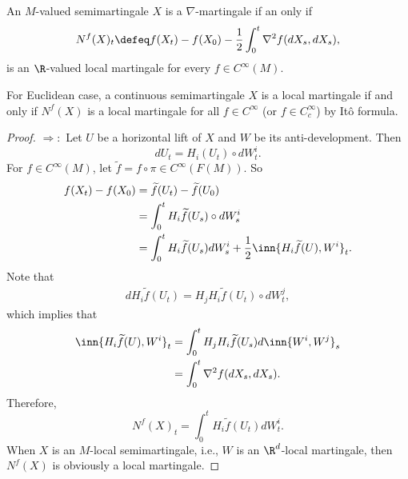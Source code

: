\begin{prop}
    An $M$-valued semimartingale $X$ is a $\nabla$-martingale if an only if 
    \begin{equation*}
        N^f(X)_t \defeq f(X_t) - f(X_0) - \frac{1}{2}\int_0^t \nabla^2f(dX_s,dX_s),
    \end{equation*}
    is an $\R$-valued local martingale for every $f \in C^\infty(M)$.
\end{prop}
\begin{rmk}
    For Euclidean case, a continuous semimartingale $X$ is a local martingale if and only if $N^f(X)$ is a local martingale for all $f \in C^\infty$ (or $f \in C_c^\infty$) by It\^o formula.
\end{rmk}
\begin{proof}
    $\Rightarrow:$ Let $U$ be a horizontal lift of $X$ and $W$ be its anti-development. Then
    \begin{equation*}
        dU_t = H_i(U_t) \circ dW^i_t.
    \end{equation*}
    For $f \in C^\infty(M)$, let $\widetilde{f} = f \circ \pi \in C^\infty(F(M))$. So
    \begin{align*}
        f(X_t) - f(X_0) &= \widetilde{f}(U_t) - \widetilde{f}(U_0) \\
        &= \int_0^t H_i\widetilde{f}(U_s) \circ dW^i_s \\
        &= \int_0^tH_i\widetilde{f}(U_s) dW^i_s + \frac{1}{2}\inn{H_i \widetilde{f}(U),W^i}_t.
    \end{align*}
    Note that
    \begin{align*}
        d H_i \widetilde{f}(U_t) = H_jH_i\widetilde{f}(U_t) \circ dW^j_t,
    \end{align*}
    which implies that
    \begin{align*}
        \inn{H_i \widetilde{f}(U),W^i}_t &= \int_0^tH_jH_i\widetilde{f}(U_s) d\inn{W^i,W^j}_s \\
        &= \int_0^t \nabla^2 f(dX_s,dX_s).
    \end{align*}
    Therefore,
    \begin{equation*}
        N^f(X)_t = \int_0^tH_i\widetilde{f}(U_t) dW^i_t.
    \end{equation*}
    When $X$ is an $M$-local semimartingale, i.e., $W$ is an $\R^d$-local martingale, then $N^f(X)$ is obviously a local martingale.


\end{proof}
